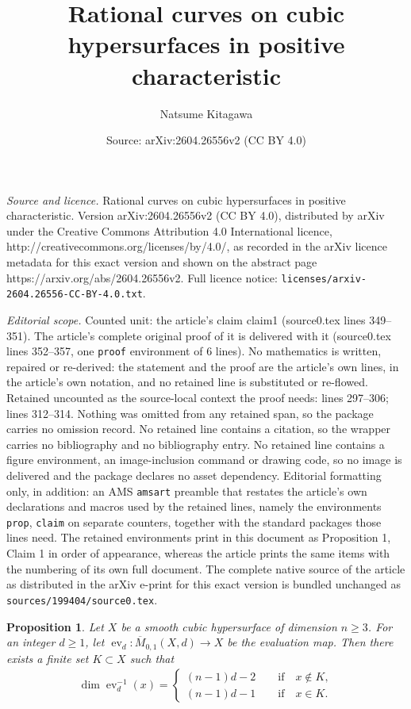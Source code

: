 \documentclass[10pt,a4paper]{amsart}
\title{Rational curves on cubic hypersurfaces in positive characteristic}
\author{Natsume Kitagawa}
\date{Source: arXiv:2604.26556v2 (CC BY 4.0)}
\newtheorem{prop}{Proposition}
\DeclareMathOperator{\ev}{ev}
\newcommand{\ol}{\overline}
\newcommand{\ra}{\rightarrow}
\begin{document}
\maketitle

\noindent\emph{Source and licence.} Rational curves on cubic hypersurfaces in positive characteristic. Version arXiv:2604.26556v2 (CC BY 4.0), distributed by arXiv under the Creative Commons Attribution 4.0 International licence, http://creativecommons.org/licenses/by/4.0/, as recorded in the arXiv licence metadata for this exact version and shown on the abstract page https://arxiv.org/abs/2604.26556v2. Full licence notice: \texttt{licenses/arxiv-2604.26556-CC-BY-4.0.txt}.\par\smallskip

\noindent\textit{Editorial scope.} Counted unit: the article's claim claim1 (source0.tex lines 349--351). The article's complete original proof of it is delivered with it (source0.tex lines 352--357, one \texttt{proof} environment of 6 lines). No mathematics is written, repaired or re-derived: the statement and the proof are the article's own lines, in the article's own notation, and no retained line is substituted or re-flowed.  Retained uncounted as the source-local context the proof needs: lines 297--306; lines 312--314.  Nothing was omitted from any retained span, so the package carries no omission record.  No retained line contains a citation, so the wrapper carries no bibliography and no bibliography entry.  No retained line contains a figure environment, an image-inclusion command or drawing code, so no image is delivered and the package declares no asset dependency.  Editorial formatting only, in addition: an AMS \texttt{amsart} preamble that restates the article's own declarations and macros used by the retained lines, namely the environments \texttt{prop}, \texttt{claim} on separate counters, together with the standard packages those lines need.  The retained environments print in this document as Proposition 1, Claim 1 in order of appearance, whereas the article prints the same items with the numbering of its own full document.  The complete native source of the article as distributed in the arXiv e-print for this exact version is bundled unchanged as \texttt{sources/199404/source0.tex}.
	\begin{prop}\label{DimOfFibres}
		Let $X$ be a smooth cubic hypersurface of dimension $n\geq3$. For an integer $d\geq1$, let $\ev_d:\ol{M}_{0,1}(X,d)\ra X$ be the evaluation map. Then there exists a finite set $K\subset X$ such that
		\begin{align*}
			\dim\ev_d^{-1}(x)=
			\begin{cases}
				(n-1)d-2\qquad\text{if}\quad x\notin K,\\
				(n-1)d-1\qquad\text{if}\quad x\in K.
			\end{cases}
		\end{align*}
	\end{prop}
\end{document}
